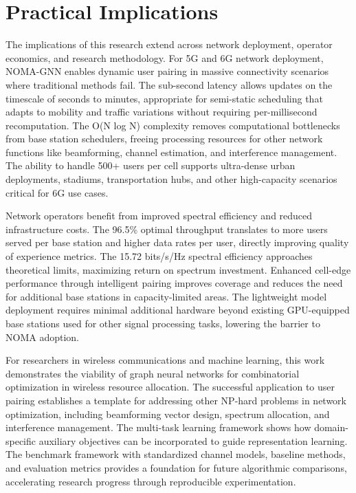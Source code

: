 \section{Practical Implications}

The implications of this research extend across network deployment, operator economics, and research methodology. For 5G and 6G network deployment, NOMA-GNN enables dynamic user pairing in massive connectivity scenarios where traditional methods fail. The sub-second latency allows updates on the timescale of seconds to minutes, appropriate for semi-static scheduling that adapts to mobility and traffic variations without requiring per-millisecond recomputation. The O(N log N) complexity removes computational bottlenecks from base station schedulers, freeing processing resources for other network functions like beamforming, channel estimation, and interference management. The ability to handle 500+ users per cell supports ultra-dense urban deployments, stadiums, transportation hubs, and other high-capacity scenarios critical for 6G use cases.

Network operators benefit from improved spectral efficiency and reduced infrastructure costs. The 96.5\% optimal throughput translates to more users served per base station and higher data rates per user, directly improving quality of experience metrics. The 15.72 bits/s/Hz spectral efficiency approaches theoretical limits, maximizing return on spectrum investment. Enhanced cell-edge performance through intelligent pairing improves coverage and reduces the need for additional base stations in capacity-limited areas. The lightweight model deployment requires minimal additional hardware beyond existing GPU-equipped base stations used for other signal processing tasks, lowering the barrier to NOMA adoption.

For researchers in wireless communications and machine learning, this work demonstrates the viability of graph neural networks for combinatorial optimization in wireless resource allocation. The successful application to user pairing establishes a template for addressing other NP-hard problems in network optimization, including beamforming vector design, spectrum allocation, and interference management. The multi-task learning framework shows how domain-specific auxiliary objectives can be incorporated to guide representation learning. The benchmark framework with standardized channel models, baseline methods, and evaluation metrics provides a foundation for future algorithmic comparisons, accelerating research progress through reproducible experimentation.

